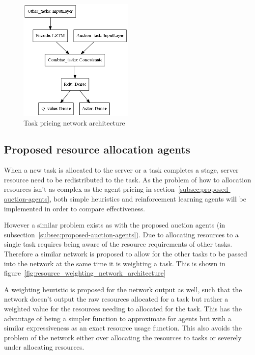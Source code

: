 \begin{figure}[h]
    \centering
    \includegraphics[width=0.5\textwidth]{figures/3_solution_figs/task_pricing_network_architecture.png}
    \caption{Task pricing network architecture}
    \label{fig:task_pricing_network_architecture}
\end{figure}

\subsection{Proposed resource allocation agents}\label{subsec:proposed-resource-allocation-agents}
When a new task is allocated to the server or a task completes a stage, server resource need to be redistributed
to the task. As the problem of how to allocation resources isn't as complex as the agent pricing in
section~\ref{subsec:proposed-auction-agents}, both simple heuristics and reinforcement learning agents will be
implemented in order to compare effectiveness.

However a similar problem exists as with the proposed auction agents (in subsection~\ref{subsec:proposed-auction-agents}).
Due to allocating resources to a single task requires being aware of the resource requirements of other
tasks. Therefore a similar network is proposed to allow for the other tasks
to be passed into the network at the same time it is weighting a task. This is shown in
figure~\ref{fig:resource_weighting_network_architecture}

A weighting heuristic is proposed for the network output as well, such that the network doesn't output the raw
resources allocated for a task but rather a weighted value for the resources needing to allocated for the task.
This has the advantage of being a simpler function to approximate for agents but with a similar expressiveness as an
exact resource usage function. This also avoids the problem of the network either over allocating the resources to tasks
or severely under allocating resources.


